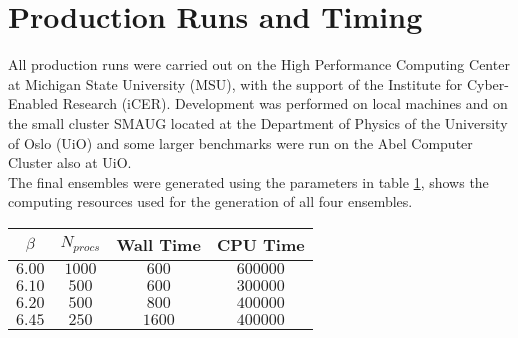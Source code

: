 \section{Production Runs and Timing}
All production runs were carried out on the High Performance Computing Center at Michigan State University (MSU), with the support of the Institute for Cyber-Enabled Research (iCER). Development was performed on local machines and on the small cluster SMAUG located at the Department of Physics of the University of Oslo (UiO) and some larger benchmarks were run on the Abel Computer Cluster also at UiO.\\
The final ensembles were generated using the parameters in table \cref{runs:times}, shows the computing resources used for the generation of all four ensembles. 
\begin{table}[!htb]
    \begin{center}
    \begin{tabular}{cccc}
        $\beta$ & $N_{procs}$ & Wall Time & CPU Time\\\hline
        $6.00$ & $1000$ & $600$ & $600000$\\
        $6.10$ & $500$ & $600$ & $300000$\\
        $6.20$ & $500$ & $800$ & $400000$\\
        $6.45$ & $250$ & $1600$ & $400000$
    \end{tabular}
    \label{runs:times} 
    \end{center}
\end{table}